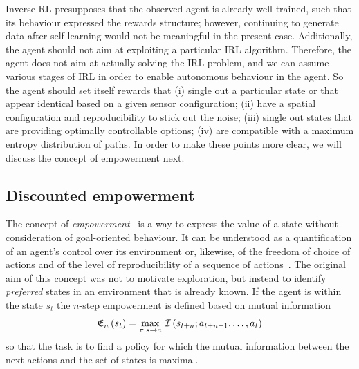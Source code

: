 \documentclass{article}
\begin{document}
Inverse RL presupposes that the observed agent is already well-trained, such that 
its behaviour expressed the rewards structure; however, continuing to generate data after
self-learning would not be meaningful in the present case. Additionally, the agent should not aim
at exploiting a particular IRL algorithm. Therefore, the agent does not aim at actually 
solving the IRL problem, and we can assume various stages of IRL in order 
to enable autonomous behaviour in the agent. So the agent should set itself rewards that
(i) single out a particular state or that appear identical based on a given sensor configuration;
(ii) have a spatial configuration and reproducibility to stick out the noise;
(iii) single out states that are providing optimally controllable options;
(iv) are compatible with a maximum entropy distribution of paths.
In order to make these points more clear, we will discuss the concept of empowerment next.


\subsection{Discounted empowerment\label{emp}\label{gammares}}

The concept of \emph{empowerment}~\citep{klyubin2005empowerment} is a way to 
express the value of a state without consideration of goal-oriented behaviour.
It can be understood as a quantification of an agent's control over its environment
or, likewise, of the freedom of choice of actions and of the 
level of reproducibility of a sequence of actions~\citep{salge2014empowerment}.
The original aim  of this concept was not to motivate exploration, 
but instead to identify \emph{preferred} states in an environment that is already known.
If the agent is within the state $s_t$ the $n$-step empowerment is defined based on mutual 
information
\begin{equation}
\mathfrak{E}_{n}\left(s_{t}\right)=\max_{\pi:s\to a}\,{\cal I}\left(s_{t+n};a_{t+n-1},\dots,a_{t}\right)\label{eq:n_powerment}
\end{equation}
so that the task is to find a policy for which the mutual information between the next actions and the set of states is maximal.
\end{document}
